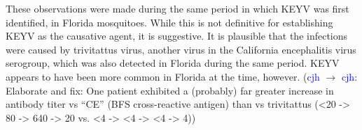 \documentclass[12pt]{article}
\newcommand{\cjh}{\textcolor{blue}{cjh}}
\newcommand{\tjh}{\textcolor{red}{tjh}}
\newcommand{\jal}{\textcolor{green}{jal}}
\newcommand{\jgm}{\textcolor{purple}{jgm}}
\newcommand{\msg}[3]{(#1 $\rightarrow$ #2: #3)}
\newcommand{\mcc}[1]{\msg\cjh\cjh{#1}}
\newcommand{\mct}[1]{\msg\cjh\tjh{#1}}
\newcommand{\mjc}[1]{\msg\jal\cjh{#1}}
\newcommand{\mgc}[1]{\msg\jgm\cjh{#1}}
\begin{document}
    These observations were made during the same period in which KEYV was first identified, in Florida mosquitoes.\cite{bond1966california} %
    While this is not definitive for establishing KEYV as the causative agent, it is suggestive.  It is plausible that the infections were caused by trivitattus virus, another virus in the California encephalitis virus serogroup, which was also detected in Florida during the same period. KEYV appears to have been more common in Florida at the time, however. \mcc{Elaborate and fix: One patient exhibited a (probably) far greater increase in antibody titer vs ``CE'' (BFS cross-reactive antigen) than vs trivitattus (<20 -> 80 -> 640 -> 20 vs. <4 -> <4 -> <4 -> 4)}
    
    
\end{document}
